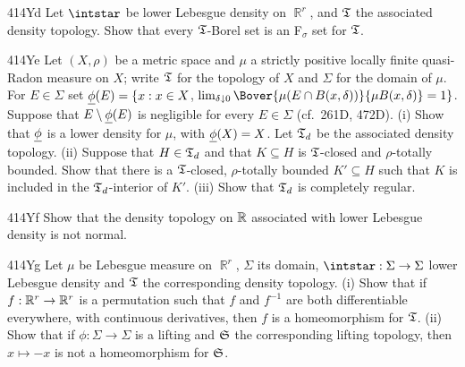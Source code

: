{\spheader 414Yd Let $\intstar$ be lower Lebesgue density on $\BbbR^r$,
and $\frak T$ the associated density topology.   Show that every
$\frak T$-Borel set is an F$_{\sigma}$ set for $\frak T$.

\spheader 414Ye Let $(X,\rho)$ be a metric space and $\mu$ a strictly
positive locally finite quasi-Radon measure on $X$;  write $\frak T$ for
the topology of $X$ and $\Sigma$ for the domain of $\mu$.   For
$E\in\Sigma$ set $\underline{\phi}(E)=\{x:x\in X$, $\lim_{\delta\downarrow 0}
\Bover{\mu(E\cap B(x,\delta))}{\mu B(x,\delta)}=1\}$.   Suppose that
$E\setminus\underline{\phi}(E)$ is
negligible for every $E\in\Sigma$ (cf.\ 261D, 472D).   (i) Show that
$\underline{\phi}$ is a lower density for $\mu$, with $\underline{\phi}(X)=X$.   Let
$\frak T_d$ be the associated density topology.   (ii) Suppose that
$H\in\frak T_d$ and that $K\subseteq H$ is $\frak T$-closed and
$\rho$-totally bounded.   Show that there is a $\frak T$-closed,
$\rho$-totally bounded $K'\subseteq H$ such that $K$ is included in the
$\frak T_d$-interior of $K'$.   (iii) Show that $\frak T_d$ is
completely regular.   

\spheader 414Yf Show that the density topology on $\Bbb R$ associated
with lower Lebesgue density is not normal.

\spheader 414Yg Let $\mu$ be Lebesgue measure on $\BbbR^r$, $\Sigma$
its domain, $\intstar:\Sigma\to\Sigma$ lower Lebesgue density and
$\frak T$ the corresponding density topology.   (i) Show that if
$f:\Bbb R^r\to\Bbb R^r$ is a permutation such that $f$ and $f^{-1}$ are
both differentiable
everywhere, with continuous derivatives, then $f$ is a homeomorphism for
$\frak T$.     (ii) Show that if $\phi:\Sigma\to\Sigma$ is a
lifting and $\frak S$ the corresponding lifting topology, then
$x\mapsto -x$ is not a homeomorphism for $\frak S$.   
}%

